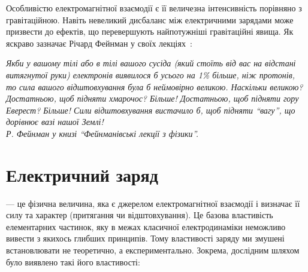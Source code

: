 Особливістю електромагнітної взаємодії є її величезна інтенсивність порівняно з
гравітаційною.
Навіть невеликий дисбаланс між електричними зарядами може призвести до ефектів, що
перевершують найпотужніші гравітаційні явища. Як яскраво зазначає Річард Фейнман у своїх
лекціях~\cite[§~1.1]{FLP2}:
\begin{tornpage}\small\itshape%
	\hspace{\parindent}Якби у вашому тілі або в тілі вашого сусіда (який стоїть від вас на
	відстані витягнутої руки) електронів виявилося б усього на 1\% більше, ніж протонів,
	то сила вашого відштовхування була б неймовірно великою. Наскільки великою?
	Достатньою, щоб підняти хмарочос? Більше! Достатньою, щоб підняти гору Еверест?
	Більше! Сили відштовхування вистачило б, щоб підняти \enquote{вагу}, що дорівнює вазі нашої
	Землі!\\

	\hfill{ Р. Фейнман у книзі \enquote{Фейнманівські лекції з фізики}}.
\end{tornpage}

\section{Електричний заряд}\hypertarget{electric-charge}{}


 --- це фізична величина, яка є джерелом
електромагнітної взаємодії і визначає її силу та характер (притягання чи відштовхування).
Це базова властивість елементарних частинок, яку в межах класичної електродинаміки
неможливо вивести з якихось глибших принципів. Тому властивості заряду ми змушені
встановлювати не теоретично, а експериментально. Зокрема, дослідним шляхом було виявлено
такі його властивості:

